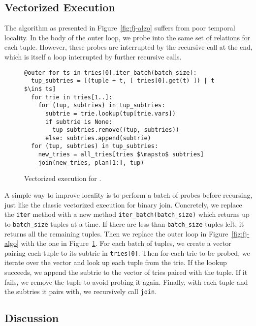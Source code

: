 \subsection{Vectorized Execution}\label{sec:vectorized-execution}
The \FJ algorithm as presented in Figure~\ref{fig:fj-algo}
  suffers from poor temporal locality.
In the body of the outer loop, 
  we probe into the same set of relations for each tuple.
However, these probes are interrupted by the recursive 
  call at the end, 
  which is itself a loop interrupted by further recursive calls.

\begin{figure}
  \begin{lstlisting}
@outer for ts in tries[0].iter_batch(batch_size):
  tup_subtries = [(tuple + t, [ tries[0].get(t) ]) | t $\in$ ts]
  for trie in tries[1..]:
    for (tup, subtries) in tup_subtries:
      subtrie = trie.lookup(tup[trie.vars])
      if subtrie is None:
        tup_subtries.remove((tup, subtries))
      else: subtries.append(subtrie)
  for (tup, subtries) in tup_subtries:
    new_tries = all_tries[tries $\mapsto$ subtries]
    join(new_tries, plan[1:], tup)
\end{lstlisting}
  \caption{Vectorized execution for \FJ.}
  \label{fig:vectorized-execution}
\end{figure}

A simple way to improve locality is to perform a batch of probes 
  before recursing, just like the classic vectorized execution 
  for binary join.
Concretely, we replace the \lstinline|iter| method 
  with a new method \lstinline|iter_batch(batch_size)|
  which returns up to \lstinline|batch_size| tuples at a time.
If there are less than \lstinline|batch_size| tuples left, 
  it returns all the remaining tuples.
Then we replace the outer loop in Figure~\ref{fig:fj-algo} 
  with the one in Figure~\ref{fig:vectorized-execution}.
For each batch of tuples, 
  we create a vector pairing each tuple to its subtrie in 
  \lstinline|tries[0]|.
Then for each trie to be probed,
  we iterate over the vector and look up each tuple 
  from the trie.
If the lookup succeeds, we append the subtrie to the vector of tries paired with the tuple.
If it fails, we remove the tuple to avoid probing it again.
Finally, with each tuple and the subtries it pairs with, 
  we recursively call \lstinline|join|.

\subsection{Discussion}\label{sec:fj-gj-multijoin}

